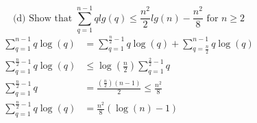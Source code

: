 \documentclass{article}
\begin{document}
\begin{enumerate}
\[
\text{(d) Show that } \sum_{q=1}^{n-1}qlg(q) \leq \frac{n^2}{2}lg(n)-\frac{n^2}{8} \text{ for } n \geq 2
\]
\begin{align*}
    \sum_{q=1}^{n-1}q\log(q) & = \sum_{q=1}^{\frac{n}{2}-1}q\log(q) + \sum_{q=\frac{n}{2}}^{n-1}q\log(q) \\
    \sum_{q=1}^{\frac{n}{2}-1}q\log(q) & \leq \log(\frac{n}{2}) \sum_{q=1}^{\frac{2}{2}-1}q \\
    \sum_{q=1}^{\frac{n}{2}-1}q & = \frac{(\frac{n}{2})(n-1)}{2} \leq \frac{n^2}{8} \\
    \sum_{q=1}^{\frac{n}{2}-1}q\log(q) & = \frac{n^2}{8}(\log(n)-1)
\end{align*}




\end{enumerate}
\end{document}
